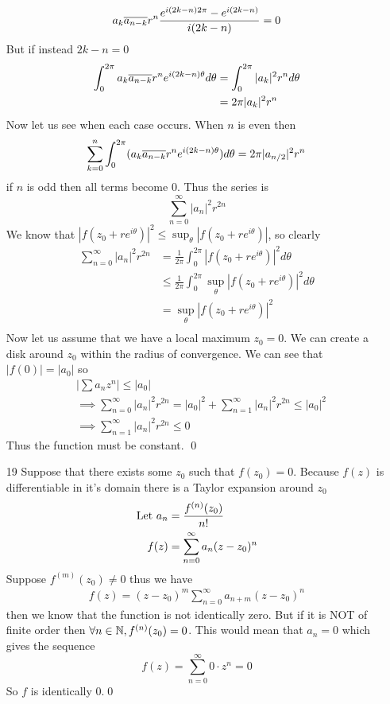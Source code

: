 \documentclass{article}
\begin{document}
\begin{enumerate}
\begin{align*}
        a_{k}\overline{a_{n-k}}r^n
        \frac{e^{i(2k-n)2\pi}-e^{i(2k-n)}}{i(2k-n)}=0\\
      \end{align*}
      But if instead $2k-n=0$
      \begin{align*}
        \int_{0}^{2\pi}a_{k}\overline{a_{n-k}}r^n
        e^{i(2k-n)\theta}d\theta&=
        \int_{0}^{2\pi}|a_k|^2r^nd\theta\\
        &=2\pi|a_k|^2r^n
      \end{align*}
      Now let us see when each case occurs. When $n$ is even then
      \[\sum_{k=0}^{n}\int_{0}^{2\pi}
        (a_{k}\overline{a_{n-k}}r^ne^{i(2k-n)\theta})d\theta=2\pi|a_{n/2}|^2r^n\]
      if $n$ is odd then all terms become $0$.
      Thus the series is
      \[\sum_{n=0}^\infty|a_n|^2r^{2n}\]
      We know that $|f(z_0+re^{i\theta})|^2\leq\sup_\theta|f(z_0+re^{i\theta})|$, so clearly
      \begin{align*}
        \sum_{n=0}^\infty|a_n|^2r^{2n}
        &=\frac{1}{2\pi}\int_{0}^{2\pi}
          \left|f(z_0+re^{i\theta})\right|^2d\theta\\
        &\leq\frac{1}{2\pi}\int_{0}^{2\pi}
          \sup_\theta\left|f(z_0+re^{i\theta})\right|^2d\theta\\
        &=\sup_\theta\left|f(z_0+re^{i\theta})\right|^2\\
      \end{align*}
      Now let us assume that we have a local maximum $z_0=0$. We can create a disk around $z_0$ within the radius of convergence. We can see that $|f(0)|=|a_0|$ so
      \begin{align*}
        &\left|\sum a_nz^n\right|\leq|a_0|\\
        &\implies \sum_{n=0}^\infty|a_n|^2r^{2n}=|a_0|^2+\sum_{n=1}^\infty|a_n|^2r^{2n}\leq|a_0|^2\\
        &\implies
        \sum_{n=1}^\infty|a_n|^2r^{2n}\leq0
      \end{align*}
      Thus the function must be constant.
      \qed
    \item[19]
      Suppose that there exists some $z_0$ such that $f(z_0)=0$. Because $f(z)$ is differentiable in it's domain there is a Taylor expansion around $z_0$
      \begin{align*}
        \text{Let } a_n&=\frac{f^{(n)}(z_0)}{n!}\\
        f(z)&=\sum_{n=0}^\infty a_n(z-z_0)^n
      \end{align*}
      Suppose $f^{(m)}(z_0)\neq0$ thus we have
      \begin{align*}
        f(z)=(z-z_0)^m\sum_{n=0}^\infty a_{n+m}(z-z_0)^n
      \end{align*}
      then we know that the function is not identically zero. But if it is NOT of finite order then $\forall n\in\mathbb{N},f^{(n)}(z_0)=0$. This would mean that $a_n=0$ which gives the sequence
      \[f(z)=\sum_{n=0}^\infty 0\cdot z^n=0\]
      So $f$ is identically 0.\qed
  \end{enumerate}
\end{document}
